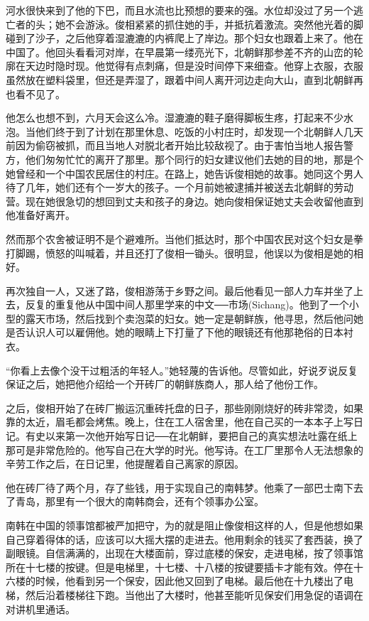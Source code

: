 河水很快来到了他的下巴，而且水流也比预想的要来的强。水位却没过了另一个逃亡者的头；她不会游泳。俊相紧紧的抓住她的手，并抵抗着激流。突然他光着的脚碰到了沙子，之后他穿着湿漉漉的内裤爬上了岸边。那个妇女也跟着上来了。他在中国了。他回头看看河对岸，在早晨第一缕亮光下，北朝鲜那参差不齐的山峦的轮廓在天边时隐时现。他觉得有点刺痛，但是没时间停下来细查。他穿上衣服，衣服虽然放在塑料袋里，但还是弄湿了，跟着中间人离开河边走向大山，直到北朝鲜再也看不见了。

他怎么也想不到，六月天会这么冷。湿漉漉的鞋子磨得脚板生疼，打起来不少水泡。当他们终于到了计划在那里休息、吃饭的小村庄时，却发现一个北朝鲜人几天前因为偷窃被抓，而且当地人对脱北者开始比较敌视了。由于害怕当地人报告警方，他们匆匆忙忙的离开了那里。那个同行的妇女建议他们去她的目的地，那是个她曾经和一个中国农民居住的村庄。在路上，她告诉俊相她的故事。她同这个男人待了几年，她们还有个一岁大的孩子。一个月前她被逮捕并被送去北朝鲜的劳动营。现在她很急切的想回到丈夫和孩子的身边。她向俊相保证她丈夫会收留他直到他准备好离开。

然而那个农舍被证明不是个避难所。当他们抵达时，那个中国农民对这个妇女是拳打脚踢，愤怒的叫喊着，并且还打了俊相一锄头。很明显，他误以为俊相是她的相好。

再次独自一人，又迷了路，俊相游荡于乡野之间。最后他看见一部人力车并坐了上去，反复的重复他从中国中间人那里学来的中文──市场(Sichang)。他到了一个小型的露天市场，然后找到个卖泡菜的妇女。她一定是朝鲜族，他寻思，然后他问她是否认识人可以雇佣他。她的眼睛上下打量了下他的眼镜还有他那艳俗的日本衬衣。

“你看上去像个没干过粗活的年轻人。”她轻蔑的告诉他。尽管如此，好说歹说反复保证之后，她把他介绍给一个开砖厂的朝鲜族商人，那人给了他份工作。

之后，俊相开始了在砖厂搬运沉重砖托盘的日子，那些刚刚烧好的砖非常烫，如果靠的太近，眉毛都会烤焦。晚上，住在工人宿舍里，他在自己买的一本本子上写日记。有史以来第一次他开始写日记──在北朝鲜，要把自己的真实想法吐露在纸上那可是非常危险的。他写自己在大学的时光。他写诗。在工厂里那令人无法想象的辛劳工作之后，在日记里，他提醒着自己离家的原因。

他在砖厂待了两个月，存了些钱，用于实现自己的南韩梦。他乘了一部巴士南下去了青岛，那里有一个很大的南韩商会，还有个领事办公室。

南韩在中国的领事馆都被严加把守，为的就是阻止像俊相这样的人，但是他想如果自己穿着得体的话，应该可以大摇大摆的走进去。他用剩余的钱买了套西装，换了副眼镜。自信满满的，出现在大楼面前，穿过底楼的保安，走进电梯，按了领事馆所在十七楼的按键。但是电梯里，十七楼、十八楼的按键要插卡才能有效。停在十六楼的时候，他看到另一个保安，因此他又回到了电梯。最后他在十九楼出了电梯，然后沿着楼梯往下跑。当他出了大楼时，他甚至能听见保安们用急促的语调在对讲机里通话。

